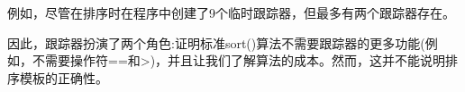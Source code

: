 例如，尽管在排序时在程序中创建了9个临时跟踪器，但最多有两个跟踪器存在。

因此，跟踪器扮演了两个角色:证明标准sort()算法不需要跟踪器的更多功能(例如，不需要操作符==和>)，并且让我们了解算法的成本。然而，这并不能说明排序模板的正确性。




































